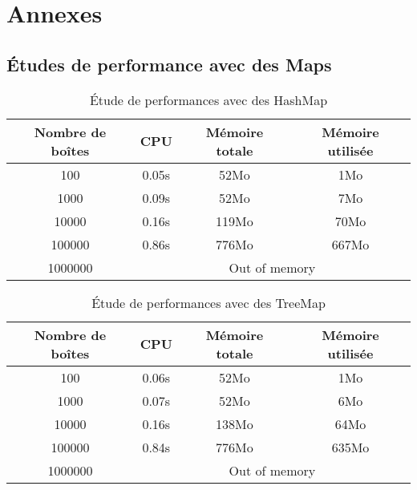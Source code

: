 
\section{Annexes}
\subsection{Études de performance avec des Maps}

\begin{table}[htpb]
  \centering
\begin{tabular}{|c|c|c|c|}
\hline
Nombre de boîtes & CPU & Mémoire totale & Mémoire utilisée\\
\hline
100 & 0.05s & 52Mo & 1Mo\\
\hline
1000 & 0.09s & 52Mo & 7Mo\\
\hline
10000 & 0.16s & 119Mo & 70Mo\\
\hline
100000 & 0.86s & 776Mo & 667Mo\\
\hline
1000000 & \multicolumn{3}{|c|}{Out of memory}\\
\hline
\end{tabular}
\caption{Étude de performances avec des HashMap}
\label{tab:hashmap1}
\end{table}

\begin{table}[htbp]
  \centering
\begin{tabular}{|c|c|c|c|}
\hline
Nombre de boîtes & CPU & Mémoire totale & Mémoire utilisée\\
\hline
100 & 0.06s & 52Mo & 1Mo\\
\hline
1000 & 0.07s & 52Mo & 6Mo\\
\hline
10000 & 0.16s & 138Mo & 64Mo\\
\hline
100000 & 0.84s & 776Mo & 635Mo\\
\hline
1000000 & \multicolumn{3}{|c|}{Out of memory}\\
\hline
\end{tabular}
\caption{Étude de performances avec des TreeMap}
\label{tab:treemap1}
\end{table}


